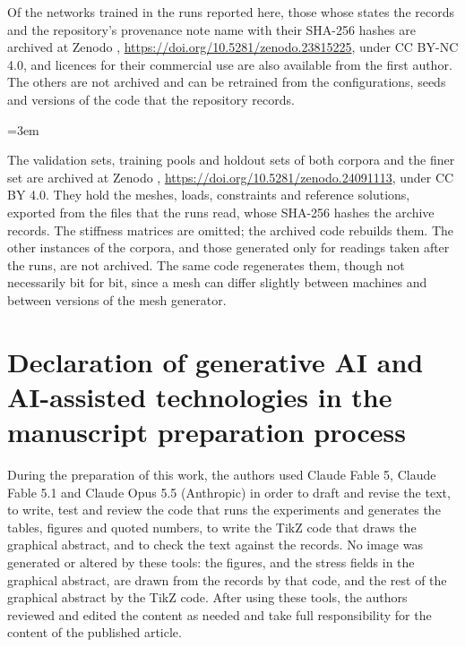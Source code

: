 Of the networks trained in the runs reported here, those whose states the records and the
repository's provenance note name with their SHA-256 hashes are archived at Zenodo
\cite{Cao2026Networks}, \url{https://doi.org/10.5281/zenodo.23815225}, under CC BY-NC 4.0, and
licences for their commercial use are also available from the first author. The others are
not archived and can be retrained from the configurations, seeds and versions of the code
that the repository records.

{\emergencystretch=3em\leavevmode\raggedright The validation sets, training pools and holdout
sets of both corpora and the finer set are archived at Zenodo \cite{Cao2026Data},
\url{https://doi.org/10.5281/zenodo.24091113}, under CC BY 4.0. They hold the meshes,
loads, constraints and reference solutions, exported from the files that the runs read,
whose SHA-256 hashes the archive records. The stiffness matrices are omitted; the archived
code rebuilds them. The other instances of the corpora, and those generated only for
readings taken after the runs, are not archived. The same code regenerates them, though
not necessarily bit for bit, since a mesh can differ slightly between machines and between
versions of the mesh generator.\par}
\fi

\section*{Declaration of generative AI and AI-assisted technologies in the manuscript preparation process}

During the preparation of this work, the authors used Claude Fable 5, Claude Fable 5.1 and
Claude Opus 5.5 (Anthropic) in order to draft and revise the text, to write, test and
review the code that runs the experiments and generates the tables, figures and quoted
numbers, to write the TikZ code that draws the graphical abstract, and to check the text
against the records. No image was generated or altered by these tools: the figures, and the
stress fields in the graphical abstract, are drawn from the records by that code, and the
rest of the graphical abstract by the TikZ code. After using these tools, the authors
reviewed and
edited the content as needed and take full responsibility for the content of the published
article.
